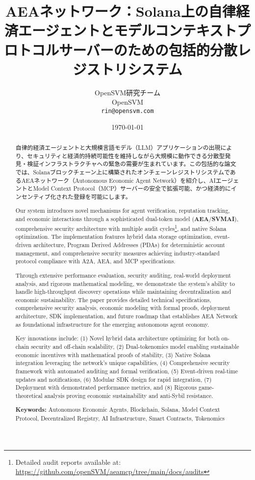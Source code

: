 \documentclass[12pt,a4paper]{article}
\title{AEAネットワーク：Solana上の自律経済エージェントとモデルコンテキストプロトコルサーバーのための包括的分散レジストリシステム}
\author{OpenSVM研究チーム\\
OpenSVM\\
\texttt{rin@opensvm.com}}
\date{\today}
\begin{document}
\maketitle

\begin{abstract}
自律的経済エージェントと大規模言語モデル（LLM）アプリケーションの出現により、セキュリティと経済的持続可能性を維持しながら大規模に動作できる分散型発見・検証インフラストラクチャへの緊急の需要が生まれています。この包括的な論文では、Solanaブロックチェーン上に構築されたオンチェーンレジストリシステムであるAEAネットワーク（Autonomous Economic Agent Network）を紹介し、AIエージェントとModel Context Protocol（MCP）サーバーの安全で拡張可能、かつ経済的にインセンティブ化された登録を可能にします。

Our system introduces novel mechanisms for agent verification, reputation tracking, and economic interactions through a sophisticated dual-token model (\textbf{AEA}/\textbf{SVMAI}), comprehensive security architecture with multiple audit cycles\footnote{Detailed audit reports available at: \url{https://github.com/openSVM/aeamcp/tree/main/docs/audits}}, and native Solana optimization. The implementation features hybrid data storage optimization, event-driven architecture, Program Derived Addresses (PDAs) for deterministic account management, and comprehensive security measures achieving industry-standard protocol compliance with A2A, AEA, and MCP specifications.

Through extensive performance evaluation, security auditing, real-world deployment analysis, and rigorous mathematical modeling, we demonstrate the system's ability to handle high-throughput discovery operations while maintaining decentralization and economic sustainability. The paper provides detailed technical specifications, comprehensive security analysis, economic modeling with formal proofs, deployment architecture, SDK implementation, and future roadmap that establishes AEA Network as foundational infrastructure for the emerging autonomous agent economy.

Key innovations include: (1) Novel hybrid data architecture optimizing for both on-chain security and off-chain scalability, (2) Dual-tokenomics model enabling sustainable economic incentives with mathematical proofs of stability, (3) Native Solana integration leveraging the network's unique capabilities, (4) Comprehensive security framework with automated auditing and formal verification, (5) Event-driven real-time updates and notifications, (6) Modular SDK design for rapid integration, (7) Deployment with demonstrated performance metrics, and (8) Rigorous game-theoretical analysis proving economic sustainability and anti-Sybil resistance.

\textbf{Keywords:} Autonomous Economic Agents, Blockchain, Solana, Model Context Protocol, Decentralized Registry, AI Infrastructure, Smart Contracts, Tokenomics
\end{abstract}
\end{document}
